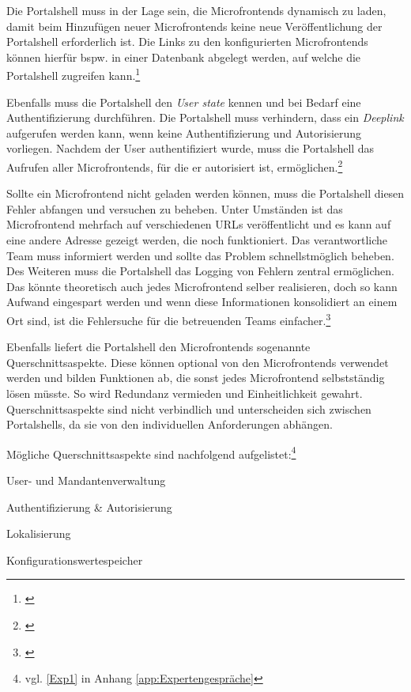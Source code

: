Die Portalshell muss in der Lage sein, die Microfrontends dynamisch zu laden, damit beim Hinzufügen neuer Microfrontends keine neue Veröffentlichung der Portalshell erforderlich ist. Die Links zu den konfigurierten Microfrontends können hierfür bspw. in einer Datenbank abgelegt werden, auf welche die Portalshell zugreifen kann.\footnote{\cite[vgl.][46]{Mezzalira2021}}

Ebenfalls muss die Portalshell den \textit{User state} kennen und bei Bedarf eine Authentifizierung durchführen. Die Portalshell muss verhindern, dass ein \textit{\gls{Deeplink}} aufgerufen werden kann, wenn keine Authentifizierung und Autorisierung vorliegen. Nachdem der User authentifiziert wurde, muss die Portalshell das Aufrufen aller Microfrontends, für die er autorisiert ist, ermöglichen.\footnote{\cite[vgl.][45]{Mezzalira2021}}

Sollte ein Microfrontend nicht geladen werden können, muss die Portalshell diesen Fehler abfangen und versuchen zu beheben. Unter Umständen ist das Microfrontend mehrfach auf verschiedenen \gls{URL}s veröffentlicht und es kann auf eine andere Adresse gezeigt werden, die noch funktioniert.
Das verantwortliche Team muss informiert werden und sollte das Problem schnellstmöglich beheben. Des Weiteren muss die Portalshell das Logging von Fehlern zentral ermöglichen. Das könnte theoretisch auch jedes Microfrontend selber realisieren, doch so kann Aufwand eingespart werden und wenn diese Informationen konsolidiert an einem Ort sind, ist die Fehlersuche für die betreuenden Teams einfacher.\footnote{\cite[vgl.][46]{Mezzalira2021}}

Ebenfalls liefert die Portalshell den Microfrontends sogenannte Querschnittsaspekte. Diese können optional von den Microfrontends verwendet werden und bilden Funktionen ab, die sonst jedes Microfrontend selbstständig lösen müsste. So wird Redundanz vermieden und Einheitlichkeit gewahrt. Querschnittsaspekte sind nicht verbindlich und unterscheiden sich zwischen Portalshells, da sie von den individuellen Anforderungen abhängen.

Mögliche Querschnittsaspekte sind nachfolgend aufgelistet:\footnote{vgl. \cref{Exp1} in Anhang \ref{app:Expertengespräche}}

\begin{compactitem}
	\item User- und Mandantenverwaltung
	\item Authentifizierung \& Autorisierung
	\item Lokalisierung
	\item Konfigurationswertespeicher
\end{compactitem}

